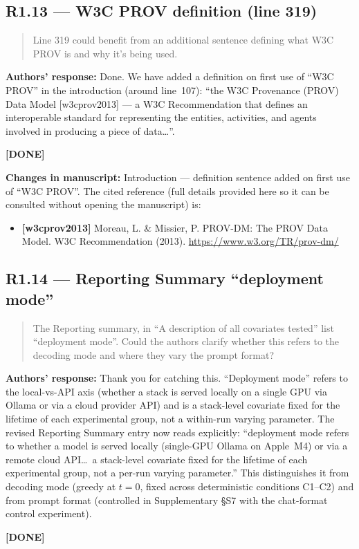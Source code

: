 \documentclass[11pt,a4paper]{article}
\newenvironment{revquote}{%
  \begin{quote}\small\itshape\color{revgray}
}{%
  \end{quote}
}
\newcommand{\response}[1]{\par\noindent\textbf{\color{revgreen}Authors' response:} #1\par}
\newcommand{\changes}[1]{\par\noindent\textbf{\color{revblue}Changes in manuscript:} #1\par}
\newcommand{\done}{\color{revgreen}\textbf{[DONE]}}
\begin{document}
\subsection*{R1.13 --- W3C PROV definition (line 319)}

\begin{revquote}
Line 319 could benefit from an additional sentence defining what W3C PROV is and why it's being used.
\end{revquote}

\response{Done. We have added a definition on first use of ``W3C PROV'' in the introduction (around line~107): ``the W3C Provenance (PROV) Data Model [w3cprov2013] --- a W3C Recommendation that defines an interoperable standard for representing the entities, activities, and agents involved in producing a piece of data\ldots''.} \done

\changes{Introduction --- definition sentence added on first use of ``W3C PROV''. The cited reference (full details provided here so it can be consulted without opening the manuscript) is:
\begin{itemize}[leftmargin=*]
  \item \textbf{[w3cprov2013]} Moreau, L. \& Missier, P. PROV-DM: The PROV Data Model. W3C Recommendation (2013). \url{https://www.w3.org/TR/prov-dm/}
\end{itemize}}

\subsection*{R1.14 --- Reporting Summary ``deployment mode''}

\begin{revquote}
The Reporting summary, in ``A description of all covariates tested'' list ``deployment mode''. Could the authors clarify whether this refers to the decoding mode and where they vary the prompt format?
\end{revquote}

\response{Thank you for catching this. ``Deployment mode'' refers to the local-vs-API axis (whether a stack is served locally on a single GPU via Ollama or via a cloud provider API) and is a stack-level covariate fixed for the lifetime of each experimental group, not a within-run varying parameter. The revised Reporting Summary entry now reads explicitly: ``deployment mode refers to whether a model is served locally (single-GPU Ollama on Apple~M4) or via a remote cloud API\ldots\ a stack-level covariate fixed for the lifetime of each experimental group, not a per-run varying parameter.'' This distinguishes it from decoding mode (greedy at $t=0$, fixed across deterministic conditions C1--C2) and from prompt format (controlled in Supplementary §S7 with the chat-format control experiment).} \done
\end{document}

